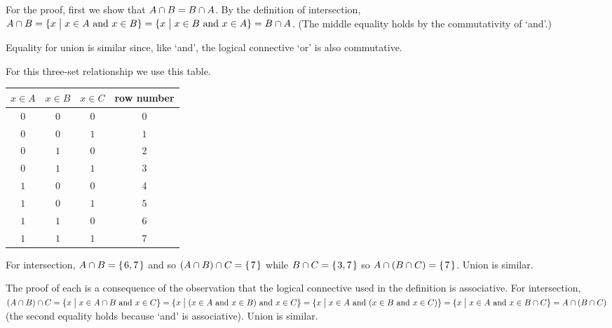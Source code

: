 \documentclass{test}  %
\begin{document}
\begin{ex}
\begin{ans}
\begin{items}
  For the proof, first we show that
  $A\cap B=B\cap A$.
  By the definition of intersection,  
  $A\cap B=\{x \bigm| \text{$x\in A$ and $x\in B$}\}
    =\{x \bigm| \text{$x\in B$ and $x\in A$}\}=B\cap A$.
  (The middle equality holds by the commutativity of `and'.)

  Equality for union is similar since, like `and', the logical connective
  `or' is also commutative.
\item For this three-set relationship we use this table.
  \begin{center} \small
    \begin{tabular}{ccc|c}
      $x\in A$  &$x\in B$  &$x\in C$  &row number \\ \hline
         $0$    &$0$       &$0$       &$0$    \\
         $0$    &$0$       &$1$       &$1$    \\
         $0$    &$1$       &$0$       &$2$    \\
         $0$    &$1$       &$1$       &$3$    \\[.5ex]
         $1$    &$0$       &$0$       &$4$    \\
         $1$    &$0$       &$1$       &$5$    \\
         $1$    &$1$       &$0$       &$6$    \\
         $1$    &$1$       &$1$       &$7$    
    \end{tabular}
  \end{center}
  For intersection, $A\cap B=\mbox{$\{\hspace{0.1em}6,7\hspace{0.1em}\}$}$ and so
  $(A\cap B)\cap C=\mbox{$\{\hspace{0.1em}7\hspace{0.1em}\}$}$ while
  $B\cap C=\mbox{$\{\hspace{0.1em}3,7\hspace{0.1em}\}$}$ so $A\cap(B\cap C)=\mbox{$\{\hspace{0.1em}7\hspace{0.1em}\}$}$.
  Union is similar.

  The proof of each is a consequence of the observation that the 
  logical connective used in the definition is associative.
  For intersection,
  $(A\cap B)\cap C=
    \{x \bigm| \text{$x\in A\cap B$ and $x\in C$}\}
    =
    \{x \bigm| \text{($x\in A$ and $x\in B$) and $x\in C$}\}
    =
    \{x \bigm| \text{$x\in A$ and ($x\in B$ and $x\in C$)}\}
   =
    \{x \bigm| \text{$x\in A$ and $x\in B\cap C$}\}
   =
   A\cap (B\cap C)$
   (the second equality holds because `and' is associative).
   Union is similar.
\end{items}
\end{ans}
\end{ex}
\end{document}
